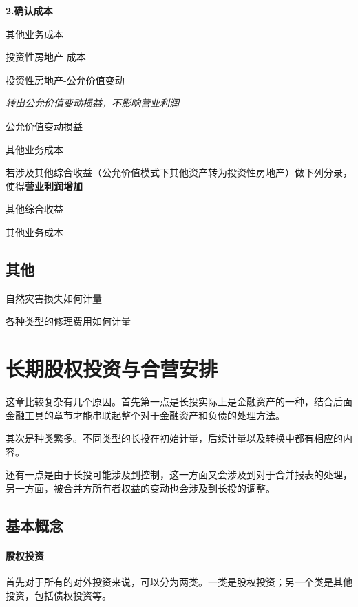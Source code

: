 \documentclass[UTF8,12pt]{ctexart}
\newenvironment{Dr}{%
	\begin{list}{}%
		{
			\setlength{\leftmargin}{2em}
			\setlength{\labelwidth}{2em}
			\setlength{\labelsep}{0pt}
			\setlength{\itemindent}{0pt}
			\setlength{\listparindent}{0pt}
			\setlength{\parsep}{0pt}
			\setlength{\topsep}{0pt}
		}
		\item[\textbf{借：}]
	}{%
	\end{list}
}
\newenvironment{Cr}{%
	\begin{list}{}%
		{
			\setlength{\leftmargin}{3em}
			\setlength{\labelwidth}{2em}
			\setlength{\labelsep}{0pt}
			\setlength{\itemindent}{0pt}
			\setlength{\listparindent}{0pt}
			\setlength{\parsep}{0pt}
			\setlength{\topsep}{0pt}
		}
		\item[\textbf{贷：}]
	}{%
	\end{list}
}
\numberwithin{equation}{section} %
\numberwithin{figure}{section}
\numberwithin{table}{section}
\begin{document}
	
	\textbf{2.确认成本}
	
	\begin{Dr}
		其他业务成本
	\end{Dr}
	\begin{Cr}
		投资性房地产-成本
		
		投资性房地产-公允价值变动
	\end{Cr}
	
	
	\textit{转出公允价值变动损益，不影响营业利润}
	
	\begin{Dr}
		公允价值变动损益
	\end{Dr}
	\begin{Cr}
		其他业务成本
	\end{Cr}
	
	若涉及其他综合收益（公允价值模式下其他资产转为投资性房地产）做下列分录，使得\textbf{营业利润增加}
	
	\begin{Dr}
		其他综合收益
	\end{Dr}
	\begin{Cr}
		其他业务成本
	\end{Cr}

	\subsection{其他}
	自然灾害损失如何计量
	
	各种类型的修理费用如何计量
	
	\newpage
	\section{长期股权投资与合营安排}
	这章比较复杂有几个原因。首先第一点是长投实际上是金融资产的一种，结合后面金融工具的章节才能串联起整个对于金融资产和负债的处理方法。
	
	其次是种类繁多。不同类型的长投在初始计量，后续计量以及转换中都有相应的内容。
	
	还有一点是由于长投可能涉及到控制，这一方面又会涉及到对于合并报表的处理，另一方面，被合并方所有者权益的变动也会涉及到长投的调整。
	
	
	\subsection{基本概念}
	\paragraph{股权投资}
	首先对于所有的对外投资来说，可以分为两类。一类是股权投资；另一个类是其他投资，包括债权投资等。
	
\end{document}

